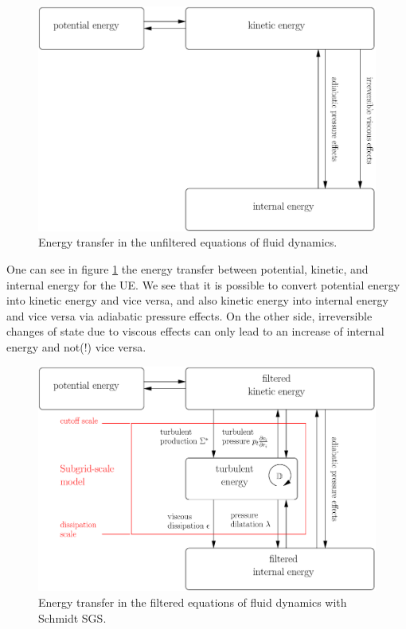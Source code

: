 \begin{figure}[tp]
\centering
\includegraphics[width=0.7\linewidth]{chapter5/energyscheme1.eps}
\caption{Energy transfer in the unfiltered equations of fluid dynamics.} 
\label{fig:UE}
\end{figure}

One can see in figure \ref{fig:UE} the energy transfer between potential,
kinetic, and internal energy for the UE. We see that it is possible to convert
potential energy into kinetic energy and vice versa, and also kinetic energy
into internal energy and vice versa via adiabatic pressure effects. On the
other side, irreversible changes of state due to viscous effects can only lead
to an increase of internal energy and not(!) vice versa. 

\begin{figure}[tp]
\centering
\includegraphics[width=0.7\linewidth]{chapter5/energyscheme3b.eps}
\caption{Energy transfer in the filtered equations of fluid dynamics with
Schmidt SGS.} 
\label{fig:FE}
\end{figure}

